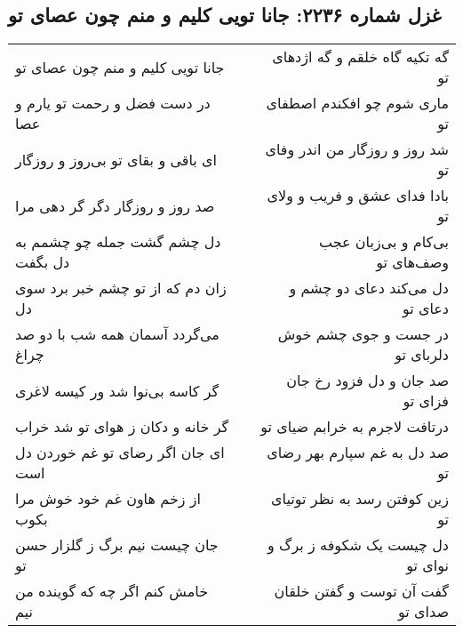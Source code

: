 \begin{center}
\section*{غزل شماره ۲۲۳۶: جانا تویی کلیم و منم چون عصای تو}
\label{sec:2236}
\begin{longtable}{l p{0.5cm} r}
جانا تویی کلیم و منم چون عصای تو
&&
گه تکیه گاه خلقم و گه اژدهای تو
\\
در دست فضل و رحمت تو یارم و عصا
&&
ماری شوم چو افکندم اصطفای تو
\\
ای باقی و بقای تو بی‌روز و روزگار
&&
شد روز و روزگار من اندر وفای تو
\\
صد روز و روزگار دگر گر دهی مرا
&&
بادا فدای عشق و فریب و ولای تو
\\
دل چشم گشت جمله چو چشمم به دل بگفت
&&
بی‌کام و بی‌زبان عجب وصف‌های تو
\\
زان دم که از تو چشم خبر برد سوی دل
&&
دل می‌کند دعای دو چشم و دعای تو
\\
می‌گردد آسمان همه شب با دو صد چراغ
&&
در جست و جوی چشم خوش دلربای تو
\\
گر کاسه بی‌نوا شد ور کیسه لاغری
&&
صد جان و دل فزود رخ جان فزای تو
\\
گر خانه و دکان ز هوای تو شد خراب
&&
درتافت لاجرم به خرابم ضیای تو
\\
ای جان اگر رضای تو غم خوردن دل است
&&
صد دل به غم سپارم بهر رضای تو
\\
از زخم هاون غم خود خوش مرا بکوب
&&
زین کوفتن رسد به نظر توتیای تو
\\
جان چیست نیم برگ ز گلزار حسن تو
&&
دل چیست یک شکوفه ز برگ و نوای تو
\\
خامش کنم اگر چه که گوینده من نیم
&&
گفت آن توست و گفتن خلقان صدای تو
\\
\end{longtable}
\end{center}
